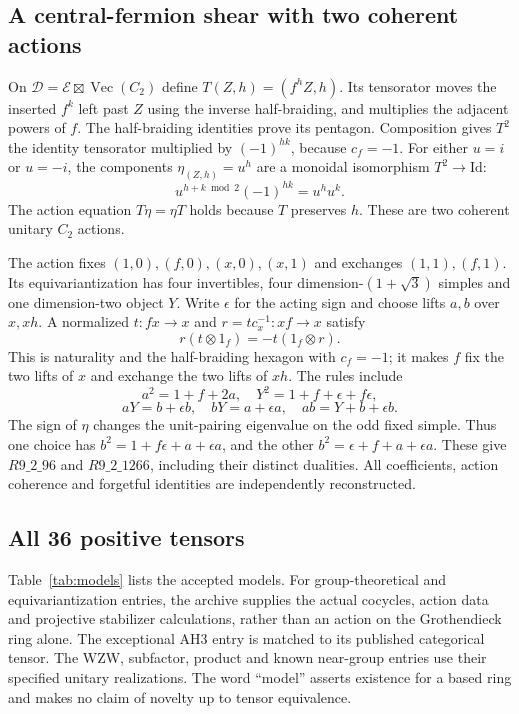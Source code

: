 \documentclass[11pt,a4paper]{article}
\theoremstyle{remark}\newtheorem{remark}[theorem]{Remark}
\renewcommand{\Vec}{\operatorname{Vec}}\newcommand{\Irr}{\operatorname{Irr}}
\begin{document}
\subsection{A central-fermion shear with two coherent actions}
On $\mathcal D=\mathcal E\boxtimes\Vec(C_2)$ define
$T(Z,h)=(f^hZ,h)$. Its tensorator moves the inserted $f^k$ left past $Z$
using the inverse half-braiding, and multiplies the adjacent powers of $f$.
The half-braiding identities prove its pentagon. Composition gives $T^2$
the identity tensorator multiplied by $(-1)^{hk}$, because $c_f=-1$.
For either $u=i$ or $u=-i$, the components $\eta_{(Z,h)}=u^h$ are a
monoidal isomorphism $T^2\to\mathrm{Id}$:
\[
 u^{h+k\bmod2}(-1)^{hk}=u^hu^k.
\]
The action equation $T\eta=\eta T$ holds because $T$ preserves $h$.
These are two coherent unitary $C_2$ actions.

The action fixes $(1,0),(f,0),(x,0),(x,1)$ and exchanges $(1,1),(f,1)$.
Its equivariantization has four invertibles, four dimension-$(1+\sqrt3)$
simples and one dimension-two object $Y$. Write $\epsilon$ for the acting
sign and choose lifts $a,b$ over $x,xh$. A normalized $t:fx\to x$ and
$r=tc_x^{-1}:xf\to x$ satisfy
\[
 r(t\otimes1_f)=-t(1_f\otimes r).
\]
This is naturality and the half-braiding hexagon with $c_f=-1$; it makes
$f$ fix the two lifts of $x$ and exchange the two lifts of $xh$.
The rules include
\[
 a^2=1+f+2a,\quad Y^2=1+f+\epsilon+f\epsilon,
\]
\[
 aY=b+\epsilon b,\quad bY=a+\epsilon a,\quad ab=Y+b+\epsilon b.
\]
The sign of $\eta$ changes the unit-pairing eigenvalue on the odd fixed
simple. Thus one choice has
$b^2=1+f\epsilon+a+\epsilon a$, and the other
$b^2=\epsilon+f+a+\epsilon a$. These give $R9\_2\_96$ and
$R9\_2\_1266$, including their distinct dualities. All coefficients,
action coherence and forgetful identities are independently reconstructed.

\subsection{All 36 positive tensors}
Table~\ref{tab:models} lists the accepted models. For group-theoretical
and equivariantization entries, the archive supplies the actual cocycles,
action data and projective stabilizer calculations, rather than an action
on the Grothendieck ring alone. The exceptional AH3 entry is matched to
its published categorical tensor. The WZW, subfactor, product and known
near-group entries use their specified unitary realizations.
The word ``model'' asserts existence for a based ring and makes no
claim of novelty up to tensor equivalence.

\end{document}
